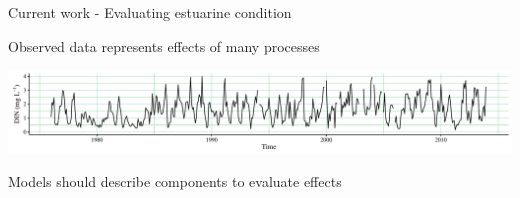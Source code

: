 \documentclass[serif]{beamer}\usepackage[]{graphicx}\usepackage[]{color}
\begin{document}
\begin{frame}[t]{Current work - Evaluating estuarine condition}
\onslide<+->
{\bf \centerline{Observed data represents effects of many processes}}
\vspace{0.15in}
\centerline{\includegraphics[width = \textwidth]{fig/ts_ex.pdf}}
\centerline{Models should describe components to evaluate effects}
\vspace{-0.1in}
\begin{columns}[t]
\begin{column}{0.5\textwidth}
\end{column}
\begin{column}{0.5\textwidth}
\end{column}
\end{columns}
\end{frame}
\end{document}
